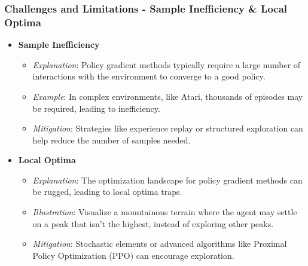 \documentclass[aspectratio=169]{beamer}
\begin{document}
\begin{frame}[fragile]
    \frametitle{Challenges and Limitations - Sample Inefficiency & Local Optima}
    \begin{itemize}
        \item \textbf{Sample Inefficiency}
            \begin{itemize}
                \item \textit{Explanation}: Policy gradient methods typically require a large number of interactions with the environment to converge to a good policy.
                \item \textit{Example}: In complex environments, like Atari, thousands of episodes may be required, leading to inefficiency.
                \item \textit{Mitigation}: Strategies like experience replay or structured exploration can help reduce the number of samples needed.
            \end{itemize}
        
        \item \textbf{Local Optima}
            \begin{itemize}
                \item \textit{Explanation}: The optimization landscape for policy gradient methods can be rugged, leading to local optima traps.
                \item \textit{Illustration}: Visualize a mountainous terrain where the agent may settle on a peak that isn’t the highest, instead of exploring other peaks.
                \item \textit{Mitigation}: Stochastic elements or advanced algorithms like Proximal Policy Optimization (PPO) can encourage exploration.
            \end{itemize}
    \end{itemize}
\end{frame}
\end{document}
